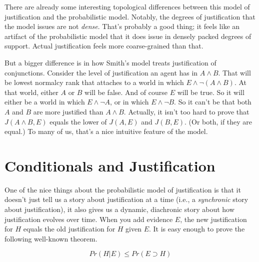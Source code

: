 There are already some interesting topological differences between this model of justification and the probabilistic model. Notably, the degrees of justification that the model issues are not \emph{dense}. That's probably a good thing; it feels like an artifact of the probabilistic model that it does issue in densely packed degrees of support. Actual justification feels more coarse-grained than that.

But a bigger difference is in how Smith's model treats justification of conjunctions. Consider the level of justification an agent has in $A \wedge B$. That will be lowest normalcy rank that attaches to a world in which $E \wedge \neg (A \wedge B)$. At that world, either $A$ or $B$ will be false. And of course $E$ will be true. So it will either be a world in which $E \wedge \neg A$, or in which $E \wedge \neg B$. So it can't be that both $A$ and $B$ are more justified than $A \wedge B$. Actually, it isn't too hard to prove that $J(A \wedge B, E)$ equals the lower of $J(A, E)$ and $J(B, E)$. (Or both, if they are equal.) To many of us, that's a nice intuitive feature of the model.

\section{Conditionals and Justification}
\label{conditionalsandjustification}

One of the nice things about the probabilistic model of justification is that it doesn't just tell us a story about justification at a time (i.e., a \emph{synchronic} story about justification), it also gives us a dynamic, diachronic story about how justification evolves over time. When you add evidence $E$, the new justification for $H$ equals the old justification for $H$ given $E$. It is easy enough to prove the following well-known theorem.

\begin{equation}
Pr(H | E) \leq Pr(E \supset H)
\end{equation}

